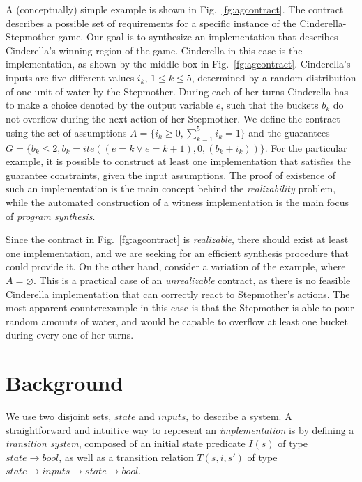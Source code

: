 A (conceptually) simple example is shown in Fig.~\ref{fg:agcontract}. The contract describes a possible set of requirements for a specific instance of the Cinderella-Stepmother game. %
Our goal is to synthesize an implementation that describes Cinderella's winning region of the game. Cinderella in this case is the implementation, as shown by the middle box in Fig.~\ref{fg:agcontract}. Cinderella's inputs are five different values $i_k$, $1 \leq k \leq 5$, determined by a random distribution of one unit of water by the Stepmother. During each of her turns Cinderella has to make a choice denoted by the output variable $e$, such that the buckets $b_k$ do not overflow during the next action of her Stepmother. We define the contract using the set of assumptions $A = \{i_k \geq 0, \sum_{k=1}^{5} i_k = 1\}$ and the guarantees $G = \{b_k \leq 2, b_k = ite((e=k \lor e=k+1), 0, (b_k+i_k))\}$. For the particular example, it is possible to construct at least one implementation that satisfies the guarantee constraints, given the input assumptions. The proof of existence of such an implementation is the main concept behind the \emph{realizability} problem, while the automated construction of a witness implementation is the main focus of \emph{program synthesis}.


Since the contract in Fig.~\ref{fg:agcontract} is \emph{realizable}, there should exist at least one implementation, and we
are seeking for an efficient synthesis procedure that could provide it.
On the other hand, consider a variation of the example, where $A = \varnothing$. This is a practical case of an
\emph{unrealizable} contract, as there is no feasible Cinderella implementation that can correctly react to Stepmother's actions. The most apparent counterexample in this case is that the Stepmother is able to pour random amounts of water, and would be capable to overflow at least one bucket during every one of her turns.

\section{Background}
\label{sec:background}
We use two disjoint sets, $state$ and $inputs$, to describe a system.
A straightforward and intuitive way to represent an \emph{implementation} is by
defining a \emph{transition system}, composed of an initial state
predicate $I(s)$ of type $state \to bool$, as well as a transition relation
$T(s,i,s')$ of type $state \to inputs \to state \to bool$.

